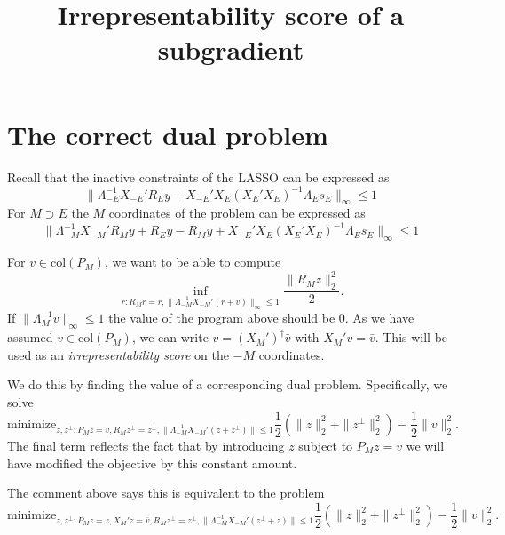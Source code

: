 \documentclass{article}
\title{ {\bf Irrepresentability score of a subgradient}}
\author{}
\begin{document}
	\maketitle \RaggedRight

        
        \section{The correct dual problem}

       Recall that the inactive constraints of the
          LASSO can be expressed as
          \begin{equation}
            \label{eq:inactive}
            \|\Lambda_{-E}^{-1}X_{-E}'R_Ey + X_{-E}'X_E(X_E'X_E)^{-1}\Lambda_Es_E\|_{\infty}
            \leq 1
            \end{equation}
          For $M \supset E$ the $M$ coordinates of the problem can be expressed as
          \begin{equation}
            \label{eq:inactive}
            \|\Lambda_{-M}^{-1}X_{-M}'R_My + R_Ey-R_My + X_{-E}'X_E(X_E'X_E)^{-1}\Lambda_Es_E\|_{\infty}
            \leq 1
            \end{equation}
          
          For $v \in \text{col}(P_M)$, we want to be able to compute
          \begin{equation}
            \label{eq:LD}
          \inf_{r: R_Mr=r,  \|\Lambda_{-M}^{-1}X_{-M}'(r + v)\|_{\infty}
            \leq 1} \frac{\|R_Mz\|^2_2}{2}.
          \end{equation}
          If $\|\Lambda_M^{-1}v\|_{\infty} \leq 1$ the value of the program above should be 0.
          As we have assumed $v \in \text{col}(P_M)$, we can write $v=(X_M')^{\dagger}\bar{v}$ with $X_M'v=\bar{v}$.
          This will be used as an {\em irrepresentability score} on the $-M$ coordinates.

          We do this by finding the value of a corresponding dual problem. Specifically, we solve
          $$
          \text{minimize}_{z,z^{\perp}: P_Mz=v, R_Mz^{\perp}=z^{\perp}, \|\Lambda_{-M}^{-1}X_{-M}'(z+z^{\perp})\| \leq 1} \frac{1}{2} \left(\|z\|^2_2 + \|z^{\perp}\|^2_2 \right) - \frac{1}{2} \|v\|^2_2.
          $$
          The final term reflects the fact that by introducing $z$ subject to $P_Mz=v$ we will have modified
          the objective by this constant amount.
          
          The comment above says this is equivalent to the problem
          $$
          \text{minimize}_{z,z^{\perp}: P_Mz=z, X_M'z=\bar{v}, R_Mz^{\perp}=z^{\perp}, \|\Lambda_{-M}^{-1}X_{-M}'(z^{\perp}+z)\| \leq 1} \frac{1}{2} \left(\|z\|^2_2 + \|z^{\perp}\|^2_2 \right) - \frac{1}{2} \|v\|^2_2.
          $$
          
\end{document}
